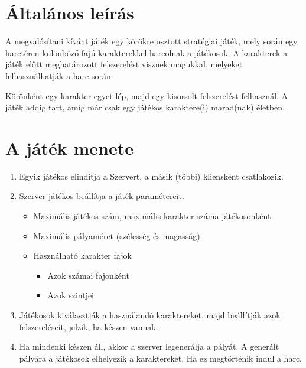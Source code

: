 \section{Általános leírás}
A megvalósítani kívánt játék egy körökre osztott stratégiai játék, mely során egy harctéren különböző fajú karakterekkel harcolnak a játékosok.
A karakterek a játék előtt meghatározott felszerelést visznek magukkal, melyeket felhasználhatják a harc során. 

Körönként egy karakter egyet lép, majd egy kisorsolt felszerelést felhasznál. A játék addig tart, amíg már csak egy játékos karaktere(i) marad(nak) életben.


\section{A játék menete}
\begin{enumerate}
	\item Egyik játékos elindítja a Szervert, a másik (többi) kliensként csatlakozik.
	\item Szerver játékos beállítja a játék paramétereit.
	\begin{itemize}\label{StartParams}
		\item Maximális játékos szám, maximális karakter száma játékosonként.
		\item Maximális pályaméret (szélesség és magasság).
		\item Használható karakter fajok
		\begin{itemize}
			\item Azok számai fajonként
			\item Azok szintjei
		\end{itemize}
	\end{itemize}
	\item Játékosok kiválasztják a használandó karaktereket, majd beállítják azok felszereléseit, jelzik, ha készen vannak.
	\item Ha mindenki készen áll, akkor a szerver legenerálja a pályát. A generált pályára a játékosok elhelyezik a karaktereket. Ha ez megtörténik indul a harc.
\end{enumerate}


